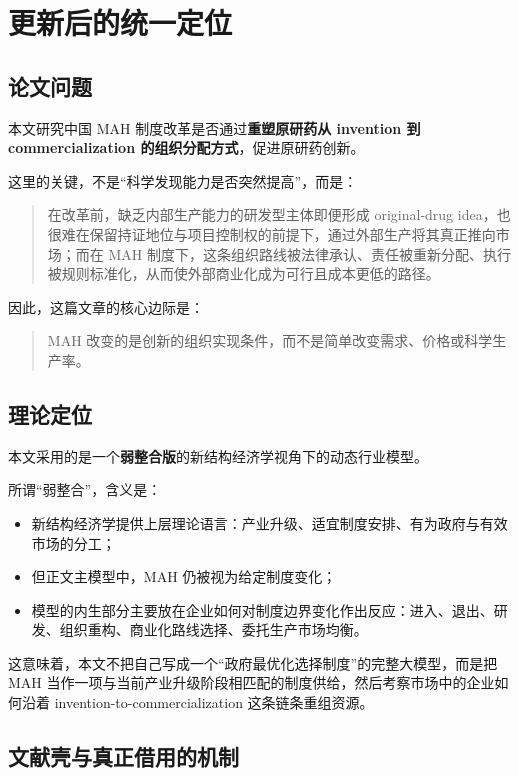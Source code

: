 \documentclass[12pt,fontset=none]{ctexart}
\begin{document}
\section{更新后的统一定位}

\subsection{论文问题}

本文研究中国 MAH 制度改革是否通过\textbf{重塑原研药从 invention 到 commercialization 的组织分配方式}，促进原研药创新。

这里的关键，不是“科学发现能力是否突然提高”，而是：

\begin{quote}
在改革前，缺乏内部生产能力的研发型主体即便形成 original-drug idea，也很难在保留持证地位与项目控制权的前提下，通过外部生产将其真正推向市场；而在 MAH 制度下，这条组织路线被法律承认、责任被重新分配、执行被规则标准化，从而使外部商业化成为可行且成本更低的路径。
\end{quote}

因此，这篇文章的核心边际是：

\begin{quote}
MAH 改变的是创新的组织实现条件，而不是简单改变需求、价格或科学生产率。
\end{quote}

\subsection{理论定位}

本文采用的是一个\textbf{弱整合版}的新结构经济学视角下的动态行业模型。

所谓“弱整合”，含义是：

\begin{itemize}
    \item 新结构经济学提供上层理论语言：产业升级、适宜制度安排、有为政府与有效市场的分工；
    \item 但正文主模型中，MAH 仍被视为给定制度变化；
    \item 模型的内生部分主要放在企业如何对制度边界变化作出反应：进入、退出、研发、组织重构、商业化路线选择、委托生产市场均衡。
\end{itemize}

这意味着，本文不把自己写成一个“政府最优化选择制度”的完整大模型，而是把 MAH 当作一项与当前产业升级阶段相匹配的制度供给，然后考察市场中的企业如何沿着 invention-to-commercialization 这条链条重组资源。

\subsection{文献壳与真正借用的机制}
\end{document}

